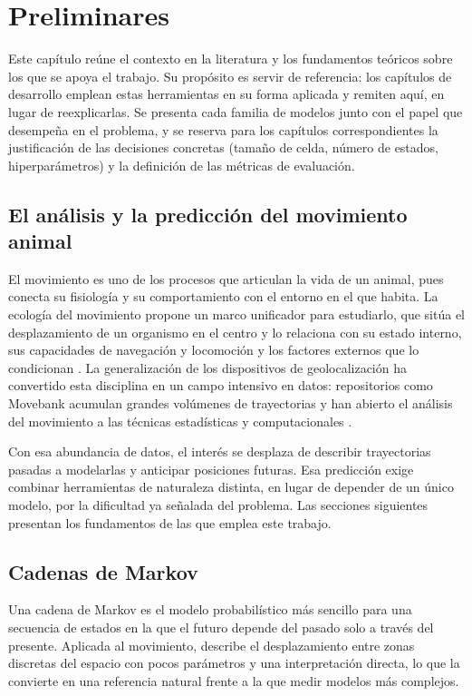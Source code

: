 \chapter{Preliminares}
\label{ch:preliminares}

Este capítulo reúne el contexto en la literatura y los fundamentos teóricos sobre
los que se apoya el trabajo. Su propósito es servir de referencia: los capítulos
de desarrollo emplean estas herramientas en su forma aplicada y remiten aquí, en
lugar de reexplicarlas. Se presenta cada familia de modelos junto con el papel que
desempeña en el problema, y se reserva para los capítulos correspondientes la
justificación de las decisiones concretas (tamaño de celda, número de estados,
hiperparámetros) y la definición de las métricas de evaluación.

\section{El análisis y la predicción del movimiento animal}
\label{sec:prelim-movimiento}

El movimiento es uno de los procesos que articulan la vida de un animal, pues
conecta su fisiología y su comportamiento con el entorno en el que habita. La
ecología del movimiento propone un marco unificador para estudiarlo, que sitúa el
desplazamiento de un organismo en el centro y lo relaciona con su estado interno,
sus capacidades de navegación y locomoción y los factores externos que lo
condicionan \cite{nathan2008}. La generalización de los dispositivos de
geolocalización ha convertido esta disciplina en un campo intensivo en datos:
repositorios como Movebank acumulan grandes volúmenes de trayectorias y han
abierto el análisis del movimiento a las técnicas estadísticas y computacionales
\cite{kays2015, demsar2015}.

Con esa abundancia de datos, el interés se desplaza de describir trayectorias
pasadas a modelarlas y anticipar posiciones futuras. Esa predicción exige combinar
herramientas de naturaleza distinta, en lugar de depender de un único modelo, por
la dificultad ya señalada del problema. Las secciones siguientes presentan los
fundamentos de las que emplea este trabajo.

\section{Cadenas de Markov}
\label{sec:prelim-markov}

Una cadena de Markov es el modelo probabilístico más sencillo para una secuencia de
estados en la que el futuro depende del pasado solo a través del presente. Aplicada
al movimiento, describe el desplazamiento entre zonas discretas del espacio con
pocos parámetros y una interpretación directa, lo que la convierte en una
referencia natural frente a la que medir modelos más complejos.

